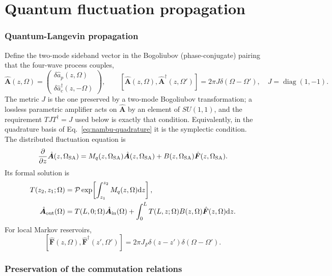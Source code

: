 \documentclass[11pt,a4paper]{article}
\newcommand{\dd}{\mathrm d}
\begin{document}
\part{Quantum fluctuation propagation}

\section{Quantum-Langevin propagation}

Define the two-mode sideband vector in the Bogoliubov (phase-conjugate)
pairing that the four-wave process couples,
\begin{equation}
\hat{\bm A}(z,\Omega)=
\begin{pmatrix}
\delta\hat a_p(z,\Omega)\\
\delta\hat a_c^\dagger(z,-\Omega)
\end{pmatrix},\qquad
[\hat{\bm A}(z,\Omega),\hat{\bm A}^\dagger(z,\Omega')]
=2\pi J\delta(\Omega-\Omega'),
\quad J=\operatorname{diag}(1,-1).
\label{eq:nambu}
\end{equation}
The metric $J$ is the one preserved by a two-mode Bogoliubov transformation;
a lossless parametric amplifier acts on $\hat{\bm A}$ by an element of
$SU(1,1)$, and the requirement $TJT^\dagger=J$ used below is exactly that
condition. Equivalently, in the quadrature basis of
Eq.~\eqref{eq:nambu-quadrature} it is the symplectic condition.
The distributed fluctuation equation is
\begin{equation}
\frac{\partial}{\partial z}\hat{\bm A}(z,\Omega_{\rm SA})
=M_q(z,\Omega_{\rm SA})\hat{\bm A}(z,\Omega_{\rm SA})
+B(z,\Omega_{\rm SA})\hat{\bm F}(z,\Omega_{\rm SA}).
\label{eq:langevin}
\end{equation}
Its formal solution is
\begin{align}
T(z_2,z_1;\Omega)&=
\mathcal P\exp\!\left[\int_{z_1}^{z_2}M_q(z,\Omega)\dd z\right],\\
\hat{\bm A}_{\rm out}(\Omega)&=
T(L,0;\Omega)\hat{\bm A}_{\rm in}(\Omega)
+\int_0^L T(L,z;\Omega)B(z,\Omega)\hat{\bm F}(z,\Omega)\dd z .
\label{eq:langevin-solution}
\end{align}
For local Markov reservoirs,
\[
[\hat{\bm F}(z,\Omega),\hat{\bm F}^\dagger(z',\Omega')]
=2\pi J_F\delta(z-z')\delta(\Omega-\Omega').
\]

\section{Preservation of the commutation relations}
\label{sec:realizability}
\end{document}
